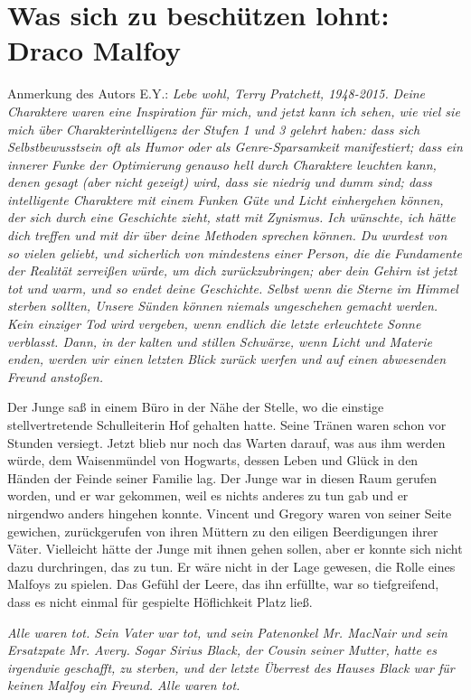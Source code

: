 \chapter{Was sich zu beschützen lohnt: Draco Malfoy}

Anmerkung des Autors E.Y.:
\emph{Lebe wohl, Terry Pratchett, 1948-2015. }
\emph{Deine Charaktere waren eine Inspiration für mich, und jetzt kann ich sehen, wie viel sie mich über Charakterintelligenz der Stufen 1 und 3 gelehrt haben: dass sich Selbstbewusstsein oft als Humor oder als Genre-Sparsamkeit manifestiert; dass ein innerer Funke der Optimierung genauso hell durch Charaktere leuchten kann, denen gesagt (aber nicht gezeigt) wird, dass sie niedrig und dumm sind; dass intelligente Charaktere mit einem Funken Güte und Licht einhergehen können, der sich durch eine Geschichte zieht, statt mit Zynismus. Ich wünschte, ich hätte dich treffen und mit dir über deine Methoden sprechen können. Du wurdest von so vielen geliebt, und sicherlich von mindestens einer Person, die die Fundamente der Realität zerreißen würde, um dich zurückzubringen; aber dein Gehirn ist jetzt tot und warm, und so endet deine Geschichte. Selbst wenn die Sterne im Himmel sterben sollten, Unsere Sünden können niemals ungeschehen gemacht werden. Kein einziger Tod wird vergeben, wenn endlich die letzte erleuchtete Sonne verblasst. Dann, in der kalten und stillen Schwärze, wenn Licht und Materie enden, werden wir einen letzten Blick zurück werfen und auf einen abwesenden Freund anstoßen. }

Der Junge saß in einem Büro in der Nähe der Stelle, wo die einstige
stellvertretende Schulleiterin Hof gehalten hatte. Seine Tränen waren schon vor
Stunden versiegt. Jetzt blieb nur noch das Warten darauf, was aus ihm werden
würde, dem Waisenmündel von Hogwarts, dessen Leben und Glück in den Händen der
Feinde seiner Familie lag. Der Junge war in diesen Raum gerufen worden, und er
war gekommen, weil es nichts anderes zu tun gab und er nirgendwo anders hingehen
konnte. Vincent und Gregory waren von seiner Seite gewichen, zurückgerufen von
ihren Müttern zu den eiligen Beerdigungen ihrer Väter. Vielleicht hätte der
Junge mit ihnen gehen sollen, aber er konnte sich nicht dazu durchringen, das zu
tun. Er wäre nicht in der Lage gewesen, die Rolle eines Malfoys zu spielen. Das
Gefühl der Leere, das ihn erfüllte, war so tiefgreifend, dass es nicht einmal
für gespielte Höflichkeit Platz ließ.

\emph{Alle waren tot. Sein Vater war tot, und sein Patenonkel Mr. MacNair und sein Ersatzpate Mr. Avery. Sogar Sirius Black, der Cousin seiner Mutter, hatte es irgendwie geschafft, zu sterben, und der letzte Überrest des Hauses Black war für keinen Malfoy ein Freund. Alle waren tot. }

